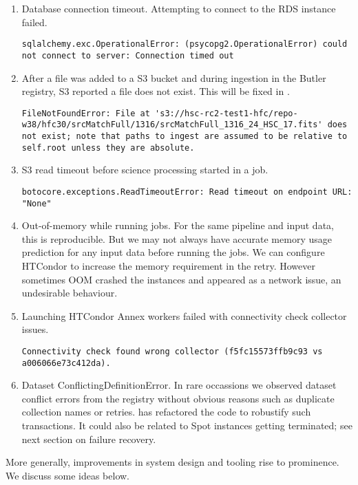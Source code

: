 \begin{enumerate}
\item Database connection timeout. Attempting to connect to the RDS instance failed.
\begin{lstlisting}[breaklines=true]
sqlalchemy.exc.OperationalError: (psycopg2.OperationalError) could not connect to server: Connection timed out
\end{lstlisting}
\item
After a file was added to a S3 bucket and during ingestion in the Butler registry, S3 reported a file does not exist.
This will be fixed in .
\begin{lstlisting}[breaklines=true]
FileNotFoundError: File at 's3://hsc-rc2-test1-hfc/repo-w38/hfc30/srcMatchFull/1316/srcMatchFull_1316_24_HSC_17.fits' does not exist; note that paths to ingest are assumed to be relative to self.root unless they are absolute.
\end{lstlisting}
\item S3 read timeout before science processing started in a job.
\begin{lstlisting}[breaklines=true]
botocore.exceptions.ReadTimeoutError: Read timeout on endpoint URL: "None"
\end{lstlisting}
\item Out-of-memory while running jobs.
For the same pipeline and input data, this is reproducible.
But we may not always have accurate memory usage prediction for any input data before running the jobs.
We can configure HTCondor to increase the memory requirement in the retry.
However sometimes OOM crashed the instances and appeared as a network issue, an undesirable behaviour.
\item Launching HTCondor Annex workers failed with connectivity check collector issues.
\begin{lstlisting}[breaklines=true]
Connectivity check found wrong collector (f5fc15573ffb9c93 vs a006066e73c412da).
\end{lstlisting}
\item Dataset ConflictingDefinitionError.
In rare occassions we observed dataset conflict errors from the registry without obvious reasons such as duplicate collection names or retries.
 has refactored the code to robustify such transactions.
It could also be related to Spot instances getting terminated;
see next section on failure recovery.
\end{enumerate}


More generally, improvements in system design and tooling rise to prominence.
We discuss some ideas below.

